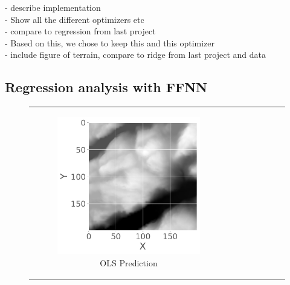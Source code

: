 - describe implementation\\
- Show all the different optimizers etc\\
- compare to regression from last project\\
- Based on this, we chose to keep this and this optimizer\\
- include figure of terrain, compare to ridge from last project and data\\



\subsection{Regression analysis with FFNN}

\begin{figure}[!htbp]
    \centering
    \begin{tabular}{cc}
        \begin{subfigure}[b]{0.45\textwidth}
            \centering
            \includegraphics[width=\textwidth]{latex/figures/terrain1.pdf}
            \caption{OLS Prediction}
            \label{fig:OLS}
        \end{subfigure} &
        \begin{subfigure}[b]{0.45\textwidth}
            \centering

\end{subfigure}
\end{tabular}
\end{figure}
